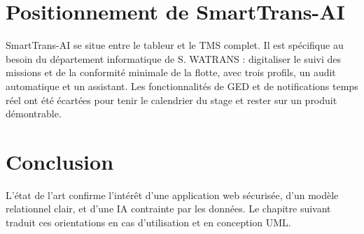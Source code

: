 \section{Positionnement de SmartTrans-AI}

SmartTrans-AI se situe entre le tableur et le TMS complet. Il est spécifique au besoin du département informatique de S. WATRANS : digitaliser le suivi des missions et de la conformité minimale de la flotte, avec trois profils, un audit automatique et un assistant. Les fonctionnalités de GED et de notifications temps réel ont été écartées pour tenir le calendrier du stage et rester sur un produit démontrable.

\section{Conclusion}

L'état de l'art confirme l'intérêt d'une application web sécurisée, d'un modèle relationnel clair, et d'une IA contrainte par les données. Le chapitre suivant traduit ces orientations en cas d'utilisation et en conception UML.
